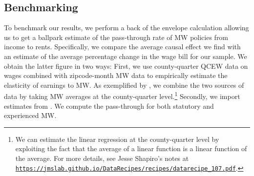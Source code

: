 \subsection{Benchmarking}\label{sec:discussion_benchmarking}
To benchmark our results, we perform a back of the envelope calculation allowing us to get a ballpark estimate 
of the pass-through rate of MW policies from income to rents. Specifically, we compare the average 
causal effect we find with an estimate of the average percentage change in the wage 
bill for our sample. We obtain the latter figure in two ways: 
First, we use county-quarter QCEW data on wages 
combined with zipcode-month MW data to empirically estimate the elasticity of earnings to MW. 
As exemplified by \textcite{gentzkow2015newspapers}, we combine the two sources of data by 
taking MW averages at the county-quarter level.\footnote{We can estimate the linear 
	regression at the county-quarter level by exploiting the fact that the average of a linear 
	function is a linear function of the average. For more details, see Jesse Shapiro's notes at \href{https://jmslab.github.io/DataRecipes/recipes/datarecipe_107.pdf}{\texttt{https://jmslab.github.io/DataRecipes/recipes/datarecipe\_107.pdf}}.} 
Secondly, we import estimates from \textcite{CegnizEtAl2019}. We compute the pass-through for
both statutory and experienced MW. 




